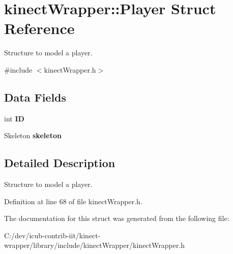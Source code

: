 \section{kinect\+Wrapper\+:\+:Player Struct Reference}
\label{structkinectWrapper_1_1Player}


Structure to model a player.  




{\ttfamily \#include $<$kinect\+Wrapper.\+h$>$}

\subsection*{Data Fields}
\begin{DoxyCompactItemize}
\item 
int {\bfseries ID}\label{structkinectWrapper_1_1Player_a9247d884d641c97fef238d71ca59eb71}

\item 
Skeleton {\bfseries skeleton}\label{structkinectWrapper_1_1Player_a8d401014445c61c049db52523cf3d5f1}

\end{DoxyCompactItemize}


\subsection{Detailed Description}
Structure to model a player. 

Definition at line 68 of file kinect\+Wrapper.\+h.



The documentation for this struct was generated from the following file\+:\begin{DoxyCompactItemize}
\item 
C\+:/dev/icub-\/contrib-\/iit/kinect-\/wrapper/library/include/kinect\+Wrapper/kinect\+Wrapper.\+h\end{DoxyCompactItemize}
